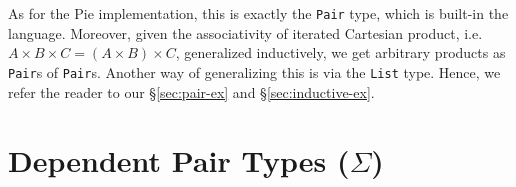 \vspace{0.3cm}

As for the Pie implementation, this is exactly the \texttt{Pair} type, which
is built-in the language. Moreover, given the associativity of iterated
Cartesian product, i.e.\ $ A \times B \times C = (A \times B) \times C $,
generalized inductively, we get arbitrary products as \texttt{Pair}s of
\texttt{Pair}s. Another way of generalizing this is via the \texttt{List}
type. Hence, we refer the reader to our \S\ref{sec:pair-ex} and \S\ref{sec:inductive-ex}.


\section{Dependent Pair Types ($ \Sigma $)}


